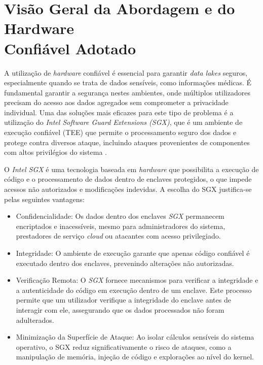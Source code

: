 \documentclass[a4paper,12pt]{article}
\begin{document}
\section[Visão Geral]{Visão Geral da Abordagem e do Hardware  \\ Confiável Adotado}

A utilização de \textit{hardware} confiável é essencial para garantir \textit{data lakes} seguros, especialmente quando se trata de dados sensíveis, como informações médicas. É fundamental garantir a segurança nestes ambientes, onde múltiplos utilizadores precisam do acesso aos dados agregados sem comprometer a privacidade individual. Uma das soluções mais eficazes para este tipo de problema é a utilização do \textit{Intel Software Guard Extensions (SGX)}, que é um ambiente de execução confiável (TEE) que permite o processamento seguro dos dados e protege contra diversos ataque, incluindo ataques provenientes de componentes com altos privilégios do sistema \cite{link}.

O \textit{Intel SGX} é uma tecnologia baseada em \textit{hardware} que possibilita a execução de código e o processamento de dados dentro de enclaves protegidos, o que impede acessos não autorizados e modificações indevidas.  A escolha do SGX justifica-se pelas seguintes vantagens:

\begin{itemize}
    \item Confidencialidade: Os dados dentro dos enclaves \textit{SGX} permanecem encriptados e inacessíveis, mesmo para administradores do sistema, prestadores de serviço \textit{cloud} ou atacantes com acesso privilegiado.
    \item Integridade: O ambiente de execução garante que apenas código confiável é executado dentro dos enclaves, prevenindo alterações não autorizadas.
    \item Verificação Remota: O \textit{SGX} fornece mecanismos para verificar a integridade e a autenticidade do código em execução dentro de um enclave. Este processo permite que um utilizador verifique a integridade do enclave antes de interagir com ele, assegurando que os dados processados não foram adulterados.
    \item Minimização da Superfície de Ataque: Ao isolar cálculos sensíveis do sistema operativo, o SGX reduz significativamente o risco de ataques, como a manipulação de memória, injeção de código e explorações ao nível do kernel.
\end{itemize}
\end{document}
